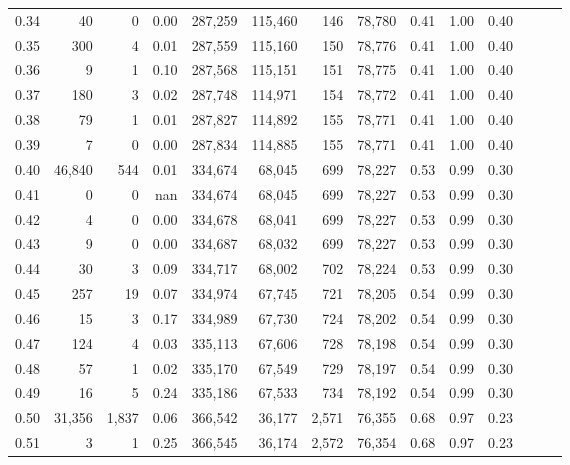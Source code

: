 \begin{tabular}{rrrrrrrrrrrrrr}
0.34 &      40 &       0 &  0.00 &  287,259 &  115,460 &     146 &  78,780 &  0.41 &  1.00 &      0.40 \\
0.35 &     300 &       4 &  0.01 &  287,559 &  115,160 &     150 &  78,776 &  0.41 &  1.00 &      0.40 \\
0.36 &       9 &       1 &  0.10 &  287,568 &  115,151 &     151 &  78,775 &  0.41 &  1.00 &      0.40 \\
0.37 &     180 &       3 &  0.02 &  287,748 &  114,971 &     154 &  78,772 &  0.41 &  1.00 &      0.40 \\
0.38 &      79 &       1 &  0.01 &  287,827 &  114,892 &     155 &  78,771 &  0.41 &  1.00 &      0.40 \\
0.39 &       7 &       0 &  0.00 &  287,834 &  114,885 &     155 &  78,771 &  0.41 &  1.00 &      0.40 \\
0.40 &  46,840 &     544 &  0.01 &  334,674 &   68,045 &     699 &  78,227 &  0.53 &  0.99 &      0.30 \\
0.41 &       0 &       0 &   nan &  334,674 &   68,045 &     699 &  78,227 &  0.53 &  0.99 &      0.30 \\
0.42 &       4 &       0 &  0.00 &  334,678 &   68,041 &     699 &  78,227 &  0.53 &  0.99 &      0.30 \\
0.43 &       9 &       0 &  0.00 &  334,687 &   68,032 &     699 &  78,227 &  0.53 &  0.99 &      0.30 \\
0.44 &      30 &       3 &  0.09 &  334,717 &   68,002 &     702 &  78,224 &  0.53 &  0.99 &      0.30 \\
0.45 &     257 &      19 &  0.07 &  334,974 &   67,745 &     721 &  78,205 &  0.54 &  0.99 &      0.30 \\
0.46 &      15 &       3 &  0.17 &  334,989 &   67,730 &     724 &  78,202 &  0.54 &  0.99 &      0.30 \\
0.47 &     124 &       4 &  0.03 &  335,113 &   67,606 &     728 &  78,198 &  0.54 &  0.99 &      0.30 \\
0.48 &      57 &       1 &  0.02 &  335,170 &   67,549 &     729 &  78,197 &  0.54 &  0.99 &      0.30 \\
0.49 &      16 &       5 &  0.24 &  335,186 &   67,533 &     734 &  78,192 &  0.54 &  0.99 &      0.30 \\
0.50 &  31,356 &   1,837 &  0.06 &  366,542 &   36,177 &   2,571 &  76,355 &  0.68 &  0.97 &      0.23 \\
0.51 &       3 &       1 &  0.25 &  366,545 &   36,174 &   2,572 &  76,354 &  0.68 &  0.97 &      0.23 \\

\end{tabular}
